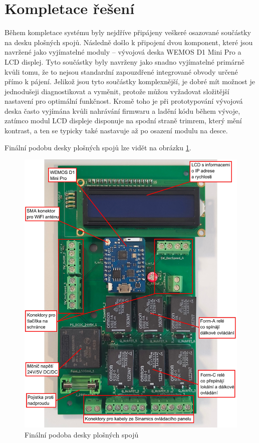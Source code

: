 \section{Kompletace řešení}

Během kompletace systému byly nejdříve připájeny veškeré osazované součástky na desku plošných spojů. Následně došlo k připojení dvou komponent, které jsou navržené jako vyjímatelné moduly – vývojová deska WEMOS D1 Mini Pro a LCD displej. Tyto součástky byly navrženy jako snadno vyjímatelné primárně kvůli tomu, že to nejsou standardní zapouzdřené integrované obvody určené přímo k pájení. Jelikož jsou tyto součástky komplexnější, je dobré mít možnost je jednodušeji diagnostikovat a vyměnit, protože můžou vyžadovat složitější nastavení pro optimální funkčnost. Kromě toho je při prototypování vývojová deska často vyjímána kvůli nahrávání firmwaru a ladění kódu během vývoje, zatímco modul LCD displeje disponuje na spodní straně trimrem, který mění kontrast, a ten se typicky také nastavuje až po osazení modulu na desce.

Finální podobu desky plošných spojů lze vidět na obrázku \ref{fig:PCBFinal}.

\begin{figure}[H]
	\centering
	\includegraphics[width=0.95\linewidth]{images/PCB_Final_annotated.jpg}
	\caption{Finální podoba desky plošných spojů}
	\label{fig:PCBFinal}
\end{figure}


